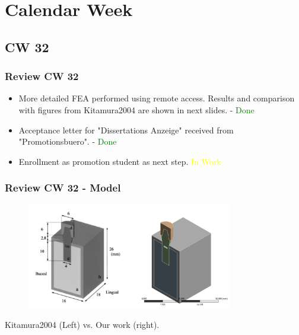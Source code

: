 \section{Calendar Week}
\subsection{CW 32}
\begin{frame}
  \frametitle{Review CW 32}
	\begin{itemize}
		\item More detailed FEA performed using remote access. Results and comparison with figures from Kitamura2004 are shown in next slides. - \textcolor{green}{Done}
		\item Acceptance letter for "Dissertations Anzeige" received from "Promotionsbuero". - \textcolor{green}{Done}
		\item Enrollment as promotion student as next step. \textcolor{yellow}{In Work}
	\end{itemize}
\end{frame}

\begin{frame}
  \frametitle{Review CW 32 - Model}
	\begin{figure}
		\includegraphics[width=0.8\textwidth]{pictures/CW32_1}
	\end{figure}
	\centering Kitamura2004 (Left) vs. Our work (right).
\end{frame}

